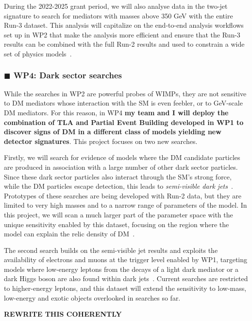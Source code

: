 \documentclass[11pt,a4paper]{article}
\begin{document}
During the 2022-2025 grant period, we will also analyse data in the two-jet signature to search for mediators with masses above 350 GeV with the entire Run-3 dataset. 
This analysis will capitalize on the end-to-end analysis workflows set up in WP2 that make the analysis more efficient and ensure that the Run-3 results can be combined with the full Run-2 results and used to constrain a wide set of physics models~\cite{Kim:2019rhy}.   

\subsubsection*{\color{orange} $\blacksquare$ \color{black} WP4: Dark sector searches}

While the searches in WP2 are powerful probes of WIMPs, they are not sensitive to DM mediators whose interaction with the SM is even feebler, or to GeV-scale DM mediators. 
For this reason, in WP4 \textbf
{my team and I will deploy the combination of TLA and Partial Event Building developed in WP1 to discover signs of DM in a different class of models yielding new detector signatures}. 
This project focuses on two new searches.  

Firstly, we will search for evidence of models where the DM candidate particles are produced in association with a large number of other dark sector particles. 
Since these dark sector particles also interact through the SM's strong force, while the DM particles escape detection, this leads to \textit{semi-visible dark jets}~\cite{Cohen:2017pzm}.
Prototypes of these searches are being developed with Run-2 data, but they are limited to very high masses and to a narrow range of parameters of the model. 
In this project, we will scan a much larger part of the parameter space with the unique sensitivity enabled by this dataset, focusing on the region where the model can explain the relic density of DM~\cite{Bernreuther:2019pfb}. 

The second search builds on the semi-visible jet results and exploits the availability of electrons and muons at the trigger level enabled by WP1, targeting models where low-energy leptons from the decays of a light dark mediator or a dark Higgs boson are also found within dark jets~\cite{Curtin:2014cca,Falkowski:2010gv}. %
Current searches are restricted to higher-energy leptons, and this dataset will extend the sensitivity to low-mass, low-energy and exotic objects overlooked in searches so far. 

\textbf{REWRITE THIS COHERENTLY}
\end{document}
